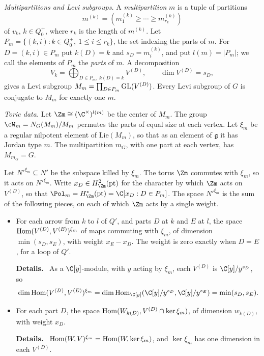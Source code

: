 \documentclass[11pt]{amsart}
\newenvironment{details}{\par\color{black!60!green}\noindent\textbf{Details.}\ }{\par}
\begin{document}
\emph{Multipartitions and Levi subgroups.}  A \emph{multipartition} $m$ is
a tuple of partitions
\[
 m^{(k)}=(m^{(k)}_1\ge\cdots\ge m^{(k)}_{r_k})
\]
of $v_k$, $k\in Q_0^+$, where $r_k$ is the length of $m^{(k)}$.  Let
$P_m=\{(k,i):k\in Q_0^+,\ 1\le i\le r_k\}$, the set indexing the parts of $m$.  For $D=(k,i)\in P_m$ put $k(D)=k$ and
$s_D=m^{(k)}_i$, and put $l(m)=|P_m|$; we call the elements of $P_m$ the
\emph{parts} of $m$.
A decomposition
\[
 V_k=\bigoplus_{D\in P_m,\ k(D)=k}V^{(D)},\qquad \dim V^{(D)}=s_D,
\]
gives a Levi subgroup $M_m=\prod_{D\in P_m}\operatorname{GL}(V^{(D)})$.
Every Levi subgroup of $G$ is conjugate to $M_m$ for exactly one $m$.  

\emph{Toric data.}  Let
$\Zm\cong(\C^\times)^{l(m)}$ be the center of $M_m$.  The group
$\cW_m=N_G(M_m)/M_m$ permutes the parts of equal size at each vertex.  Let
$\xi_m$ be a regular nilpotent element of $\mathrm{Lie}(M_m)$, so that as an
element of $\mathfrak g$ it has Jordan type $m$.  The multipartition $m_G$,
with one part at each vertex, has $M_{m_G}=G$.

Let $N'^{\xi_m}\subseteq N'$ be the subspace killed by $\xi_m$.  The torus
$\Zm$ commutes with $\xi_m$, so it acts on $N'^{\xi_m}$.  Write
$x_D\in H^2_{\Zm}(\mathrm{pt})$ for the character by which $\Zm$ acts on
$V^{(D)}$, so that $\Pol_m=H^*_{\Zm}(\mathrm{pt})=\C[x_D:D\in P_m]$.  The space
$N'^{\xi_m}$ is the sum of the following pieces, on each of which $\Zm$ acts
by a single weight.
\begin{itemize}[leftmargin=2em]
\item For each arrow from $k$ to $l$ of $Q'$, and parts $D$ at $k$ and $E$ at
$l$, the space $\operatorname{Hom}(V^{(D)},V^{(E)})^{\xi_m}$ of maps commuting with
$\xi_m$, of dimension $\min(s_D,s_E)$, with weight $x_E-x_D$.  The weight is
zero exactly when $D=E$, for a loop of $Q'$.
\begin{details}
As a $\C[y]$-module, with $y$ acting by
$\xi_m$, each $V^{(D)}$ is $\C[y]/y^{s_D}$, so
\[
 \dim \Hom(V^{(D)},V^{(E)})^{\xi_m}=\dim \Hom_{\C[y]}(\C[y]/y^{s_D},\C[y]/y^{s_E})=\min(s_D,s_E).
\]
\end{details}
\item For each part $D$, the space $\operatorname{Hom}(W_{k(D)},V^{(D)}\cap\ker\xi_m)$, of
dimension $w_{k(D)}$, with weight $x_D$.
\begin{details}
$\operatorname{Hom}(W,V)^{\xi_m}=\operatorname{Hom}(W,\ker\xi_m)$, and $\ker\xi_m$ has one dimension in
each $V^{(D)}$.
\end{details}
\end{itemize}
\end{document}
